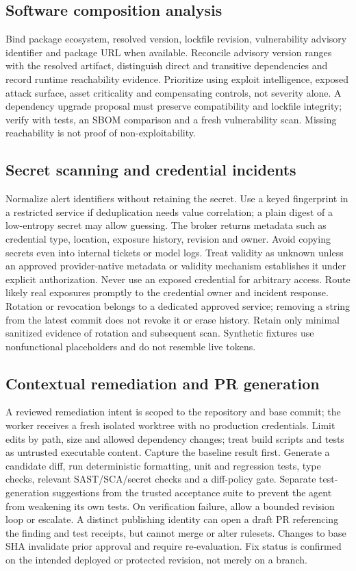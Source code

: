 \documentclass[11pt,letterpaper]{article}
\begin{document}
\subsection{Software composition analysis}
Bind package ecosystem, resolved version, lockfile revision, vulnerability advisory identifier and package URL when available. Reconcile advisory version ranges with the resolved artifact, distinguish direct and transitive dependencies and record runtime reachability evidence. Prioritize using exploit intelligence, exposed attack surface, asset criticality and compensating controls, not severity alone. A dependency upgrade proposal must preserve compatibility and lockfile integrity; verify with tests, an SBOM comparison and a fresh vulnerability scan. Missing reachability is not proof of non-exploitability.

\subsection{Secret scanning and credential incidents}
Normalize alert identifiers without retaining the secret. Use a keyed fingerprint in a restricted service if deduplication needs value correlation; a plain digest of a low-entropy secret may allow guessing. The broker returns metadata such as credential type, location, exposure history, revision and owner. Avoid copying secrets even into internal tickets or model logs. Treat validity as unknown unless an approved provider-native metadata or validity mechanism establishes it under explicit authorization. Never use an exposed credential for arbitrary access. Route likely real exposures promptly to the credential owner and incident response. Rotation or revocation belongs to a dedicated approved service; removing a string from the latest commit does not revoke it or erase history. Retain only minimal sanitized evidence of rotation and subsequent scan. Synthetic fixtures use nonfunctional placeholders and do not resemble live tokens.

\subsection{Contextual remediation and PR generation}
A reviewed remediation intent is scoped to the repository and base commit; the worker receives a fresh isolated worktree with no production credentials. Limit edits by path, size and allowed dependency changes; treat build scripts and tests as untrusted executable content. Capture the baseline result first. Generate a candidate diff, run deterministic formatting, unit and regression tests, type checks, relevant SAST/SCA/secret checks and a diff-policy gate. Separate test-generation suggestions from the trusted acceptance suite to prevent the agent from weakening its own tests. On verification failure, allow a bounded revision loop or escalate. A distinct publishing identity can open a draft PR referencing the finding and test receipts, but cannot merge or alter rulesets. Changes to base SHA invalidate prior approval and require re-evaluation. Fix status is confirmed on the intended deployed or protected revision, not merely on a branch.
\end{document}
